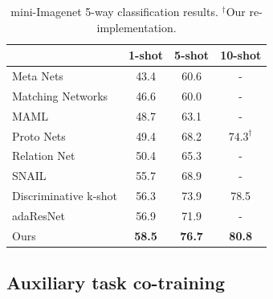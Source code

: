 \documentclass{article}
\begin{document}
\begin{table}[t!]
\centering
\label{table:key_results}
\caption{mini-Imagenet 5-way classification results. $^\dagger$Our re-implementation.}
\label{table:sota}
\begin{tabular}{@{}lccc@{}}
\toprule
\multicolumn{1}{c}{} &  \multicolumn{1}{c}{1-shot} & \multicolumn{1}{c}{5-shot} & \multicolumn{1}{c}{10-shot} \\ \midrule 
Meta Nets \citep{ravi2016optimization} & 43.4 & 60.6 & -  \\
Matching Networks \citep{vinyals2016matching} & 46.6 & 60.0 & - \\
MAML \citep{finn2017model} & 48.7 & 63.1 & - \\
Proto Nets \citep{snell2017prototypical} & 49.4 & 68.2 & $74.3^{\dagger}$ \\
Relation Net \citep{sung2018learning} & 50.4 & 65.3 & - \\ 
SNAIL \citep{mishra2018simle} & 55.7 & 68.9 & - \\ 
Discriminative k-shot \citep{Bauer2017discriminative} & 56.3 & 73.9 & 78.5 \\ 
adaResNet \citep{munkhdalai2018rapid} & 56.9 & 71.9 & - \\ \midrule
Ours & \textbf{58.5} & \textbf{76.7} &  \textbf{80.8}  \\ \bottomrule
\end{tabular} 
\end{table}

\subsection{Auxiliary task co-training} \label{ssec:theory_multitask}

\end{document}
